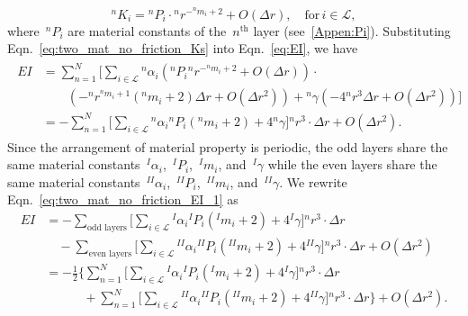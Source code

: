 \documentclass[preprint,10pt,times]{elsarticle}
\numberwithin{equation}{section}
\renewcommand{\>}{$\Rightarrow$}
\begin{document}
\begin{equation}
	{}^{n}\!{K_{i}} = {}^{n}\!{P_{i}} \cdot {}^{n}\!{r}^{-{}^{n}\!{m_{i}} + 2} + O(\Delta r), \quad \text{for}\, i \in \mathcal{L},
	\label{eq:two_mat_no_friction_Ks}
\end{equation}
where~${}^{n}\!{P_{i}}$ are material constants of the~$n^{\text{th}}$ layer (see~\ref{Appen:Pi}).  Substituting Eqn.~\eqref{eq:two_mat_no_friction_Ks} into Eqn.~\eqref{eq:EI}, we have
\begin{equation}
	\begin{aligned}
	\begin{split}
	EI & = \sum_{n=1}^{N} \bigg[ \sum_{i \in \mathcal{L}} {}^{n}\!{\alpha_{i}} \left( {}^{n}\!{P_{i}} {}^{n}\!{r}^{-{}^{n}\!{m_{i}} + 2} + O(\Delta r) \right) \cdot \\ & \qquad{} (- {}^{n}\!{r}^{{}^{n}\!{m_{i}}+1}({}^{n}\!{m_{i}} + 2 ) \Delta r + O(\Delta r^2))  + {}^{n}\!\gamma (-4 {}^{n}\!{r}^3 \Delta r + O(\Delta r^2)) \bigg] \\
	 & = -\sum_{n=1}^{N} \bigg[ \sum_{i \in \mathcal{L}} {}^{n}\!{\alpha_{i}} {}^{n}\!{P_{i}} ({}^{n}\!{m_{i}} + 2) + 4{}^{n}\!\gamma \bigg] {}^{n}\!{r}^3 \cdot \Delta r + O(\Delta r^2).
	\end{split}
	\end{aligned}
	\label{eq:two_mat_no_friction_EI_1}
\end{equation}
Since the arrangement of material property is periodic, the odd layers share the same material constants~${}^{I}\!{\alpha_{i}}$,~${}^{I}\!{P_{i}}$,~${}^{I}\!{m_{i}}$, and~${}^{I}\!\gamma$ while the even layers share the same material constants~${}^{II}\!{\alpha_{i}}$,~${}^{II}\!{P_{i}}$,~${}^{II}\!{m_{i}}$, and~${}^{II}\!\gamma$. We rewrite Eqn.~\eqref{eq:two_mat_no_friction_EI_1} as
\begin{equation}
	\begin{aligned}
		EI & = -\sum_{\text{odd layers}} \bigg[ \sum_{i \in \mathcal{L}} {}^{I}\!{\alpha_{i}} {}^{I}\!{P_{i}} ({}^{I}\!{m_{i}} + 2) + 4{}^{I}\!\gamma \bigg] {}^{n}\!{r}^3 \cdot \Delta r \\ & \quad{} -\sum_{\text{even layers}} \bigg[ \sum_{i \in \mathcal{L}} {}^{II}\!{\alpha_{i}} {}^{II}\!{P_{i}} ({}^{II}\!{m_{i}} + 2) + 4{}^{II}\!\gamma \bigg] {}^{n}\!{r}^3 \cdot \Delta r + O(\Delta r^2) \\
		 & = -\frac{1}{2}
		 \bigg\lbrace
		 \sum_{n=1}^N \bigg[ \sum_{i \in \mathcal{L}} {}^{I}\!{\alpha_{i}} {}^{I}\!{P_{i}} ({}^{I}\!{m_{i}} + 2) + 4{}^{I}\!\gamma \bigg] {}^{n}\!{r}^3 \cdot \Delta r \\ & \quad\qquad{} + \sum_{n=1}^N \bigg[ \sum_{i \in \mathcal{L}} {}^{II}\!{\alpha_{i}} {}^{II}\!{P_{i}} ({}^{II}\!{m_{i}} + 2) + 4{}^{II}\!\gamma \bigg] {}^{n}\!{r}^3 \cdot \Delta r
		 \bigg\rbrace + O(\Delta r^2).
	\end{aligned}
	\label{eq:two_mat_no_friction_EI_2}
\end{equation}
\end{document}
